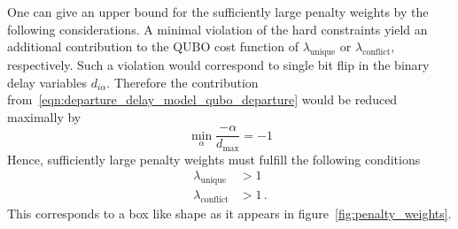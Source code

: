 One can give an upper bound for the sufficiently large penalty weights by the following considerations.
A minimal violation of the hard constraints yield an additional contribution to the QUBO cost function of $\lambda_\text{unique}$ or $\lambda_\text{conflict}$, respectively.
Such a violation would correspond to single bit flip in the binary delay variables $d_{i\alpha}$.
Therefore the contribution from~\eqref{eqn:departure_delay_model_qubo_departure} would be reduced maximally by 
\begin{equation*}
    \min_\alpha \frac{-\alpha}{d_\text{max}} = - 1    
\end{equation*}
Hence, sufficiently large penalty weights must fulfill the following conditions
\begin{align*}
    \lambda_\text{unique} & > 1 \\
    \lambda_\text{conflict} &> 1 \, .
\end{align*}
This corresponds to a box like shape as it appears in figure~\ref{fig:penalty_weights}.
